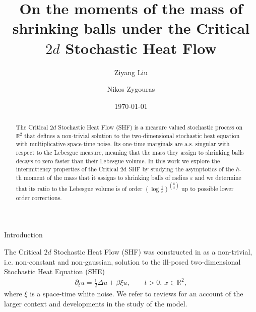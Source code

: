 \documentclass[a4paper,reqno,11pt]{amsart}
\date{\today}
\author{Ziyang Liu}
\author{Nikos Zygouras}
\makeatletter
\def\section{\@startsection{section}{1}%
  \z@{.7\linespacing\@plus\linespacing}{.5\linespacing}%
  {\normalfont\large\bfseries\centering}}
\numberwithin{equation}{section}
\theoremstyle{mytheorem}
\newcommand{\gb}{\beta}
\newcommand{\R}{\mathbb{R}}
\renewcommand{\epsilon}{\varepsilon}
\makeatother
\begin{document}
\title{On the moments of the mass of shrinking balls under the Critical $2d$ Stochastic Heat Flow }
\maketitle

\begin{abstract}
    The Critical $2d$ Stochastic Heat Flow (SHF) is a measure valued stochastic process on $\R^2$ that
    defines a non-trivial solution to the two-dimensional stochastic heat equation with multiplicative 
    space-time noise. Its one-time marginals are a.s. singular with respect to the Lebesgue measure, 
    meaning that the mass they assign to shrinking balls decays to zero faster than their Lebesgue volume.
    In this work we explore the intermittency properties of the Critical 2d SHF by studying the  asymptotics of the  $h$-th moment 
    of the mass that it assigns to shrinking balls of radius $\epsilon$ and we determine that its ratio to the Lebesgue volume
    is of order $(\log\tfrac{1}{\epsilon})^{{h\choose 2}}$ up to possible lower order corrections.
    
\end{abstract}


\section{Introduction}

 The Critical $2d$ Stochastic Heat Flow (SHF) was constructed in \cite{CSZ23a} as a non-trivial, i.e. non-constant and non-gaussian, solution
 to the ill-posed two-dimensional Stochastic Heat Equation (SHE)
\begin{align}\label{SHE}
    \partial_t u = \frac{1}{2}\Delta u+\gb \xi u, \qquad t>0, \, x\in \R^2,
\end{align}
where $\xi$ is a space-time white noise. 
We refer to reviews \cite{CSZ24, CSZ26} for an account of the larger context
and developments in the study of the model.
\end{document}
